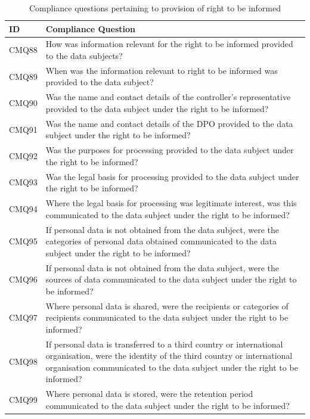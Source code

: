 \begin{table}
\small
\centering
\caption{Compliance questions pertaining to provision of right to be informed}\label{table:info:compliance-right-informed}
\begin{tabularx}{\textwidth}{|l|X|}
\hline
\textbf{ID} & \textbf{Compliance Question} \\ \hline
CMQ88 & How was information relevant for the right to be informed provided to the data subjects? \\ \hline
CMQ89 & When was the information relevant to right to be informed was provided to the data subject? \\ \hline
CMQ90 & Was the name and contact details of the controller’s representative provided to the data subject under the right to be informed? \\ \hline
CMQ91 & Was the name and contact details of the DPO provided to the data subject under the right to be informed? \\ \hline
CMQ92 & Was the purposes for processing provided to the data subject under the right to be informed? \\ \hline
CMQ93 & Was the legal basis for processing provided to the data subject under the right to be informed? \\ \hline
CMQ94 & Where the legal basis for processing was legitimate interest, was this communicated to the data subject under the right to be informed? \\ \hline
CMQ95 & If personal data is not obtained from the data subject, were the categories of personal data obtained communicated to the data subject under the right to be informed? \\ \hline
CMQ96 & If personal data is not obtained from the data subject, were the sources of data communicated to the data subject under the right to be informed? \\ \hline
CMQ97 & Where personal data is shared, were the recipients or categories of recipients communicated to the data subject under the right to be informed? \\ \hline
CMQ98 & If personal data is transferred to a third country or international organisation, were the identity of the third country or international organisation communicated to the data subject under the right to be informed? \\ \hline
CMQ99 & Where personal data is stored, were the retention period communicated to the data subject under the right to be informed? \\ \hline

\end{tabularx}
\end{table}
